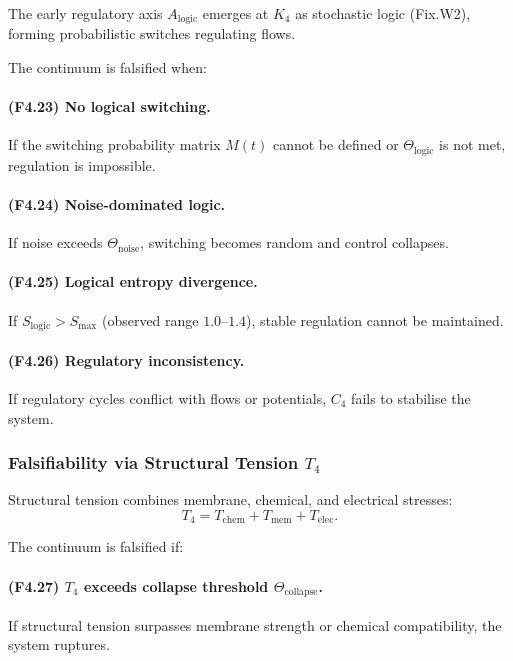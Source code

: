 The early regulatory axis $A_{\mathrm{logic}}$ emerges at $K_4$ as
stochastic logic (Fix.W2), forming probabilistic switches regulating
flows.

The continuum is falsified when:

\paragraph{(F4.23) No logical switching.}
If the switching probability matrix $M(t)$ cannot be defined or
$\Theta_{\mathrm{logic}}$ is not met, regulation is impossible.

\paragraph{(F4.24) Noise-dominated logic.}
If noise exceeds $\Theta_{\mathrm{noise}}$, switching becomes random and
control collapses.

\paragraph{(F4.25) Logical entropy divergence.}
If $S_{\mathrm{logic}} > S_{\max}$ (observed range $1.0$–$1.4$),
stable regulation cannot be maintained.

\paragraph{(F4.26) Regulatory inconsistency.}
If regulatory cycles conflict with flows or potentials, $C_4$ fails to
stabilise the system.



\subsubsection{Falsifiability via Structural Tension \texorpdfstring{$T_4$}{T_4}}

Structural tension combines membrane, chemical, and electrical stresses:
\[
T_4 = T_{\mathrm{chem}} + T_{\mathrm{mem}} + T_{\mathrm{elec}}.
\]

The continuum is falsified if:

\paragraph{(F4.27) \texorpdfstring{$T_4$}{T_4} exceeds collapse threshold $\Theta_{\mathrm{collapse}}$.}
If structural tension surpasses membrane strength or chemical
compatibility, the system ruptures.

